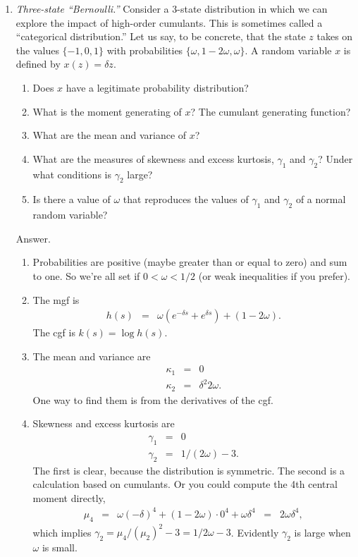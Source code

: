 \documentclass[11pt]{article}
\begin{document}
\begin{enumerate}
\begin{enumerate}
\end{enumerate}

\item {\it Three-state ``Bernoulli.''\/}
Consider a 3-state distribution
in which we can explore the impact of high-order cumulants.
This is sometimes called a ``categorical distribution.''
Let us say, to be concrete, that the state $z$ takes on the values
 $\{-1, 0, 1\}$ with
 probabilities $\{\omega, 1-2\omega, \omega \}$.
 A random variable $x$ is defined by $x(z) = \delta z$.

\begin{enumerate}
\item Does $x$ have a legitimate probability distribution?
\item What is the moment generating of $x$?  The cumulant generating function?
\item What are the mean and variance of $x$?
\item What are the measures of skewness and excess kurtosis,
$\gamma_1$ and $\gamma_2$?
Under what conditions is $\gamma_2$ large?
\item Is there a value of $\omega$ that reproduces the values
of $\gamma_1$ and $\gamma_2$ of a normal random variable?
\end{enumerate}

Answer.
\begin{enumerate}
\item Probabilities are positive (maybe greater than or equal to zero)
and sum to one.
So we're all set if $ 0 < \omega < 1/2$
(or weak inequalities if you prefer).

\item The mgf is
\begin{eqnarray*}
    h(s) &=& \omega (e^{-\delta s} + e^{\delta s}) + (1-2\omega).
\end{eqnarray*}
The cgf is $k(s) = \log h(s)$.

\item The mean and variance are
\begin{eqnarray*}
    \kappa_1  &=& 0 \\
    \kappa_2  &=& \delta^2 2 \omega .
\end{eqnarray*}
One way to find them is from the derivatives of the cgf.

\item Skewness and excess kurtosis are
\begin{eqnarray*}
    \gamma_1  &=& 0 \\
    \gamma_2  &=& 1/(2 \omega) - 3 .
\end{eqnarray*}
The first is clear, because the distribution is symmetric.
The second is a calculation based on cumulants.
Or you could compute the 4th central moment directly,
\begin{eqnarray*}
    \mu_4 &=&  \omega (-\delta)^4 + (1-2\omega) \cdot 0^4 + \omega \delta^4 \;\;=\;\;
        2 \omega \delta^4 ,
\end{eqnarray*}
which implies $\gamma_2 = \mu_4 /(\mu_2)^2 - 3  = 1/2\omega - 3 $.
Evidently $\gamma_2$ is large when $\omega$ is small.


\end{enumerate}
\end{enumerate}
\end{document}
